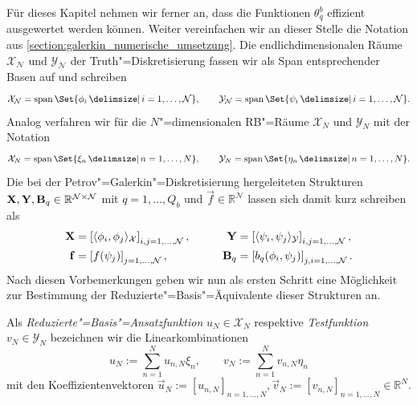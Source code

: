 \documentclass[../main.tex]{subfiles}
\begin{document}
Für dieses Kapitel nehmen wir ferner an, dass die Funktionen $\theta_{q}^{b}$ effizient ausgewertet werden können.
Weiter vereinfachen wir an dieser Stelle die Notation aus \cref{section:galerkin_numerische_umsetzung}.
Die endlichdimensionalen Räume $\mathcal X_{\mathcal N}$ und $\mathcal Y_{\mathcal N}$ der Truth"=Diskretisierung fassen wir als Span entsprechender Basen auf und schreiben
\begin{equation}
    \mathcal X_{\mathcal N} = \spn \Set{ \phi_{i} \given i = 1, \dots, \mathcal N },
    \qquad
    \mathcal Y_{\mathcal N} = \spn \Set{ \psi_{i} \given i = 1, \dots, \mathcal N }.
\end{equation}
Analog verfahren wir für die $N$"=dimensionalen RB"=Räume $\mathcal X_{N}$ und $\mathcal Y_{N}$ mit der Notation
\begin{equation}
    \mathcal X_{N} = \spn \Set{ \xi_{n} \given n = 1, \dots, N},
    \qquad
    \mathcal Y_{N} = \spn \Set{ \eta_{n} \given n = 1, \dots, N}.
\end{equation}
Die bei der Petrov"=Galerkin"=Diskretisierung hergeleiteten Strukturen $\mathbf{X}, \mathbf{Y}, \mathbf{B}_q \in \mathbb{R}^{\mathcal N \times \mathcal N}$ mit $q = 1, \dots, Q_b$ und $\vec{f} \in \mathbb{R}^{\mathcal N}$ lassen sich damit kurz schreiben als
\begin{equation}
    \begin{aligned}
        \mathbf{X} &= \left[ \langle\phi_{i},\phi_{j}\rangle_{\mathcal X} \right]_{i,j = 1, \dots, \mathcal N},
        &\qquad
        \mathbf{Y} &= \left[ \langle\psi_{i},\psi_{j}\rangle_{\mathcal Y} \right]_{i,j = 1, \dots, \mathcal N},
        \\
        \mathbf{f} &= \left[ f(\psi_{j}) \right]_{j = 1, \dots, \mathcal N},
        &\qquad
        \mathbf{B}_{q} &= \left[ b_{q}(\phi_{i}, \psi_{j}) \right]_{j,i = 1, \dots, \mathcal N}.
    \end{aligned}
\end{equation}
Nach diesen Vorbemerkungen geben wir nun als ersten Schritt eine Möglichkeit zur Bestimmung der Reduzierte"=Basis"=Äquivalente dieser Strukturen an.

\begin{Definition}\label{definition:rb_ansatz_und_testfunktionen}
    Als \emph{Reduzierte"=Basis"=Ansatzfunktion} $u_{N} \in \mathcal X_{N}$ respektive \emph{Testfunktion} $v_{N} \in \mathcal Y_{N}$ bezeichnen wir die Linearkombinationen
    \begin{equation}
        u_{N} := \sum_{n = 1}^{N} u_{n, N} \xi_{n},
        \qquad
        v_{N} := \sum_{n = 1}^{N} v_{n, N} \eta_{n}
    \end{equation}
    mit den Koeffizientenvektoren $\vec{u}_{N} := [u_{n, N}]_{n = 1, \dots, N}, \vec{v}_{N} := [v_{n,N}]_{n = 1, \dots, N} \in \mathbb{R}^{N}$.
\end{Definition}
\end{document}
